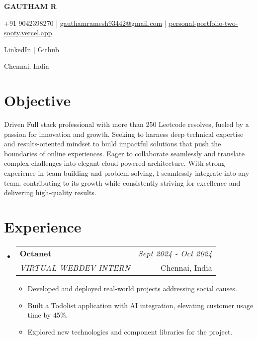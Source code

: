 \documentclass[a4paper,11pt]{article}
\makeatletter
\newcommand{\resumeSubheading}[4]{
\vspace{0.5mm}\item
    \begin{tabular*}{0.98\textwidth}[t]{l@{\extracolsep{\fill}}r}
        \textbf{#1} & \textit{\footnotesize{#4}} \\
        \textit{\footnotesize{#3}} &  \footnotesize{#2}\\
    \end{tabular*}
    \vspace{-2.4mm}
}
\newcommand{\resumeSubHeadingListStart}{\begin{itemize}[leftmargin=*,labelsep=1mm]}
\newcommand{\resumeItemListStart}{\begin{itemize}[leftmargin=*,labelsep=1mm,itemsep=0.5mm]}
\newcommand{\resumeSubHeadingListEnd}{\end{itemize}\vspace{2mm}}
\newcommand{\resumeItemListEnd}{\end{itemize}\vspace{-2mm}}
\newcommand{\socialicon}[1]{\raisebox{-0.05em}{\resizebox{!}{1em}{#1}}}
\newcommand{\headerfontiii}{\fontfamily{ppl}\selectfont} %
\makeatother
\begin{document}
\headerfontiii

\begin{center}
    {\Huge\textbf{GAUTHAM R}}
\end{center}
\vspace{-6mm}

\begin{center}
    \small{
    +91 9042398270 | \href{mailto:gauthamramesh93442@gmail.com}{gauthamramesh93442@gmail.com} | 
    \href{https://personal-portfolio-two-sooty.vercel.app/}{personal-portfolio-two-sooty.vercel.app}
    }
\end{center}
\vspace{-6mm}

\begin{center}
    \small{
    \socialicon{\faLinkedin} \href{https://www.linkedin.com/in/gauthamramesh07/}{LinkedIn} | 
    \socialicon{\faGithub} \href{https://github.com/rgautham7}{Github}
    }
\end{center}
\vspace{-6mm}
\begin{center}
    \small{Chennai, India}
\end{center}

\vspace{-4mm}

\section{\textbf{Objective}}
\vspace{1mm}
\small{
Driven Full stack professional with more than 250 Leetcode resolves, fueled by a passion for innovation and growth. Seeking to harness deep technical expertise and results-oriented mindset to build impactful solutions that push the boundaries of online experiences. Eager to collaborate seamlessly and translate complex challenges into elegant cloud-powered architecture. With strong experience in team building and problem-solving, I seamlessly integrate into any team, contributing to its growth while consistently striving for excellence and delivering high-quality results.
}
\vspace{-2mm}



\section{\textbf{Experience}}
\vspace{-0.4mm}
  \resumeSubHeadingListStart
  \resumeSubheading
      {{Octanet}}{Chennai, India}
      {VIRTUAL WEBDEV INTERN}{Sept 2024 - Oct 2024}
      \resumeItemListStart
      \item Developed and deployed real-world projects addressing social causes.
      \item Built a Todolist application with AI integration, elevating customer usage time by 45\%.
      \item Explored new technologies and component libraries for the project.
      \resumeItemListEnd 
  \resumeSubHeadingListEnd
\vspace{-6mm}
\end{document}
